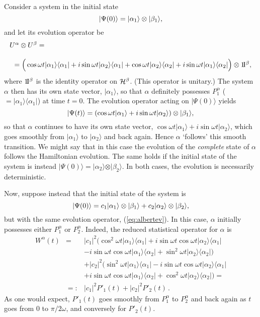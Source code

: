 \documentclass[12pt]{article}
\newcommand{\be}{\vspace*{6pt} \begin{equation}}
\newcommand{\ee}{\vspace*{10pt} \end{equation}}
\newcommand{\ident}{1\!{\rm I}}                                 %
\newcommand{\cH}{\cal{H}}                                       %
\newcommand{\ga}{\alpha}                                        %
\newcommand{\gb}{\beta}                                         %
\newcommand{\gw}{\omega}                                        %
\newcommand{\bra}[1]{\langle #1\vert}                           %
\newcommand{\ket}[1]{\vert #1\rangle}                           %
\begin{document}
Consider a system in the initial state
\be
\label{eq:albertsimple}
\ket{\Psi(0)} = \ket{\ga_1}\otimes\ket{\gb_1},
\ee
and let its evolution operator be
\be
  \label{eq:albertev}
  \begin{array}{l}
    U^{\ga} \otimes U^{\gb}= \\[3ex]
    \ \ = \Big( \cos \omega t \ket{\ga_1}\bra{\ga_1} +
    i\sin \omega t \ket{\ga_2}\bra{\ga_1} + \cos \omega t
    \ket{\ga_2}\bra{\ga_2} + i\sin \omega t \ket{\ga_1}\bra{\ga_2} \Big)
    \otimes \ident^{\gb},
  \end{array}
\ee
where $\ident^{\gb}$ is the identity operator on $\cH^{\gb}$.  (This 
operator is unitary.) The system $\ga$ then has its own state vector, 
$\ket{\ga_1}$, so that $\ga$ definitely possesses $P^{\ga}_1$ ($= 
\ket{\ga_1}\bra{\ga_1}$) at time $t = 0$.  The evolution operator 
acting on $\ket{\Psi(0)}$ yields
\be
  \label{eq:albertsimpletime}
  \ket{\Psi(t)} = \left(  \cos \gw t \ket{\ga_1} + i \sin \gw t
  \ket{\ga_2}\right)\otimes\ket{\gb_1},
\ee
so that $\ga$ continues to have its own state vector, $\cos \gw t
\ket{\ga_1} + i \sin \gw t \ket{\ga_2}$, which goes smoothly from
$\ket{\ga_1}$ to $\ket{\ga_2}$ and back again.  Hence $\ga$ `follows' 
this smooth transition.  We might say that in this case the evolution 
of the {\it complete} state of $\ga$ follows the Hamiltonian evolution.  
The same holds if the initial state of the system is instead 
$\ket{\Psi(0)} = \ket{\ga_2}\otimes\ket{\gb_2}$.  In both cases, the 
evolution is necessarily deterministic.

Now, suppose instead that the initial state of the system is
\be
  \label{eq:albertinitial}
  \ket{\Psi(0)} = c_1 \ket{\ga_1}\otimes\ket{\gb_1} +
  c_2 \ket{\ga_2}\otimes\ket{\gb_2},
\ee
but with the same evolution operator, (\ref{eq:albertev}).  In this 
case, $\ga$ initially possesses either $P^{\ga}_1$ or $P^{\ga}_2$.  
Indeed, the reduced statistical operator for $\ga$ is
\begin{eqnarray}
  W^{\ga}(t) & = & |c_1|^2 \Big( \cos^2 \gw t \ket{\ga_1}\bra{\ga_1}
  + i \sin\gw t \cos\gw t \ket{\ga_2}\bra{\ga_1} \nonumber  \\
             &   &
  - i \sin\gw t \cos\gw t \ket{\ga_1}\bra{\ga_2} +
  \sin^2 \gw t \ket{\ga_2}\bra{\ga_2} \Big) \nonumber   \\
             &   &
  + |c_2|^2 \Big( \sin^2 \gw t \ket{\ga_1}\bra{\ga_1} -
  i \sin\gw t \cos\gw t \ket{\ga_2}\bra{\ga_1} \nonumber   \\
             &   & 
  + i \sin\gw t \cos\gw t \ket{\ga_1}\bra{\ga_2} +
  \cos^2 \gw t \ket{\ga_2}\bra{\ga_2} \Big) = \nonumber  \\[1ex]
             & =:& |c_1|^2 {P'}_1(t) + |c_2|^2 {P'}_2(t)\,.
  \label{eq:albertreduced}
\end{eqnarray}
As one would expect, ${P'}_1(t)$ goes smoothly from $P^{\ga}_1$ to
$P^{\ga}_2$ and back again as $t$ goes from $0$ to $\pi/2\gw$, and
conversely for ${P'}_2(t)$.
\end{document}
